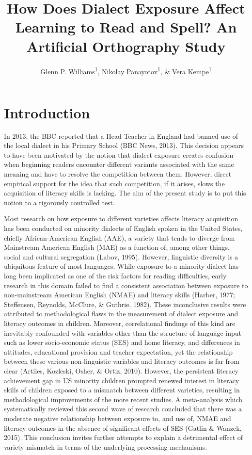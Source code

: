 \documentclass[doc,floatsintext]{apa6}
\title{How Does Dialect Exposure Affect Learning to Read and Spell? An
Artificial Orthography Study}
\author{Glenn P. Williams\textsuperscript{1}, Nikolay
Panayotov\textsuperscript{1}, \& Vera Kempe\textsuperscript{1}}
\date{}
\affiliation{
\vspace{0.5cm}
\textsuperscript{1} Abertay University}
\begin{document}
\maketitle

\section{Introduction}\label{introduction}

In 2013, the BBC reported that a Head Teacher in England had banned use
of the local dialect in his Primary School (BBC News, 2013). This
decision appears to have been motivated by the notion that dialect
exposure creates confusion when beginning readers encounter different
variants associated with the same meaning and have to resolve the
competition between them. However, direct empirical support for the idea
that such competition, if it arises, slows the acquisition of literacy
skills is lacking. The aim of the present study is to put this notion to
a rigorously controlled test.

Most research on how exposure to different varieties affects literacy
acquisition has been conducted on minority dialects of English spoken in
the United States, chiefly African-American English (AAE), a variety
that tends to diverge from Mainstream American English (MAE) as a
function of, among other things, social and cultural segregation (Labov,
1995). However, linguistic diversity is a ubiquitous feature of most
languages. While exposure to a minority dialect has long been implicated
as one of the risk factors for reading difficulties, early research in
this domain failed to find a consistent association between exposure to
non-mainstream American English (NMAE) and literacy skills (Harber,
1977; Steffensen, Reynolds, McClure, \& Guthrie, 1982). These
inconclusive results were attributed to methodological flaws in the
measurement of dialect exposure and literacy outcomes in children.
Moreover, correlational findings of this kind are inevitably confounded
with variables other than the structure of language input such as lower
socio-economic status (SES) and home literacy, and differences in
attitudes, educational provision and teacher expectation, yet the
relationship between these various non-linguistic variables and literacy
outcomes is far from clear (Artiles, Kozleski, Osher, \& Ortiz, 2010).
However, the persistent literacy achievement gap in US minority children
prompted renewed interest in literacy skills of children exposed to a
mismatch between different varieties, resulting in methodological
improvements of the more recent studies. A meta-analysis which
systematically reviewed this second wave of research concluded that
there was a moderate negative relationship between exposure to, and use
of, NMAE and literacy outcomes in the absence of significant effects of
SES (Gatlin \& Wanzek, 2015). This conclusion invites further attempts
to explain a detrimental effect of variety mismatch in terms of the
underlying processing mechanisms.
\end{document}
